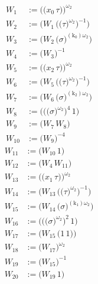 \begin{align*}
W_{1} &:= \bigl(\bigl(x_{0}\,\tau\bigr)\bigr)^{\omega_2} \\
W_{2} &:= \bigl(W_{1}\,\bigl(\bigl(\tau\bigr)^{\omega_2}\bigr)^{-1}\bigr) \\
W_{3} &:= \bigl(W_{2}\,\bigl(\sigma\bigr)^{(\mathrm{k}_{0})\omega_2}\bigr) \\
W_{4} &:= \bigl(W_{3}\bigr)^{-1} \\
W_{5} &:= \bigl(\bigl(x_{2}\,\tau\bigr)\bigr)^{\omega_2} \\
W_{6} &:= \bigl(W_{5}\,\bigl(\bigl(\tau\bigr)^{\omega_2}\bigr)^{-1}\bigr) \\
W_{7} &:= \bigl(W_{6}\,\bigl(\sigma\bigr)^{(\mathrm{k}_{2})\omega_2}\bigr) \\
W_{8} &:= \bigl(\bigl(\bigl(\sigma\bigr)^{\omega_2}\bigr)^{4}\,1\bigr) \\
W_{9} &:= \bigl(W_{7}\,W_{8}\bigr) \\
W_{10} &:= \bigl(W_{9}\bigr)^{-4}
\end{align*}
\begin{align*}
W_{11} &:= \bigl(W_{10}\,1\bigr) \\
W_{12} &:= \bigl(W_{4}\,W_{11}\bigr) \\
W_{13} &:= \bigl(\bigl(x_{1}\,\tau\bigr)\bigr)^{\omega_2} \\
W_{14} &:= \bigl(W_{13}\,\bigl(\bigl(\tau\bigr)^{\omega_2}\bigr)^{-1}\bigr) \\
W_{15} &:= \bigl(W_{14}\,\bigl(\sigma\bigr)^{(\mathrm{k}_{1})\omega_2}\bigr) \\
W_{16} &:= \bigl(\bigl(\bigl(\sigma\bigr)^{\omega_2}\bigr)^{2}\,1\bigr) \\
W_{17} &:= \bigl(W_{15}\,\bigl(1\,1\bigr)\bigr) \\
W_{18} &:= \bigl(W_{17}\bigr)^{\omega_2} \\
W_{19} &:= \bigl(W_{15}\bigr)^{-1} \\
W_{20} &:= \bigl(W_{19}\,1\bigr)
\end{align*}
